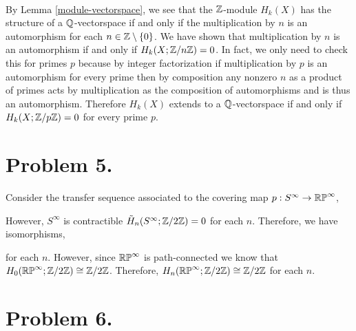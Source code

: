 \documentclass[12pt]{extarticle}
\begin{document}
\bigskip\\ 
By Lemma \ref{module-vectorspace}, we see that the $\mathbb{Z}$-module $H_k(X)$ has the structure of a $\mathbb{Q}$-vectorspace if and only if the multiplication by $n$ is an automorphism for each $n \in \mathbb{Z} \setminus \{0\}$. We have shown that multiplication by $n$ is an automorphism if and only if $H_k(X ; \mathbb{Z} / n \mathbb{Z}) = 0$. In fact, we only need to check this for primes $p$ because by integer factorization if multiplication by $p$ is an automorphism for every prime then by composition any nonzero $n$ as a product of primes acts by multiplication as the composition of automorphisms and is thus an automorphism. Therefore $H_k(X)$ extends to a $\mathbb{Q}$-vectorspace if and only if $H_k(X ; \mathbb{Z} / p \mathbb{Z}) = 0$ for every prime $p$.   

\section*{Problem 5.}

Consider the transfer sequence associated to the covering map $p : S^\infty \to \mathbb{RP}^\infty$,

\begin{center}
\end{center}
However, $S^\infty$ is contractible $\tilde{H}_n(S^{\infty} ; \mathbb{Z} / 2 \mathbb{Z}) = 0$ for each $n$. Therefore, we have isomorphisms,
\begin{center}
\end{center}
for each $n$. However, since $\mathbb{RP}^\infty$ is path-connected we know that $H_0(\mathbb{RP}^\infty; \mathbb{Z} / 2 \mathbb{Z} ) \cong \mathbb{Z} / 2 \mathbb{Z}$. Therefore, $H_n(\mathbb{RP}^\infty ; \mathbb{Z} / 2 \mathbb{Z}) \cong \mathbb{Z} / 2 \mathbb{Z}$ for each $n$.  
\section*{Problem 6.}
\end{document}
